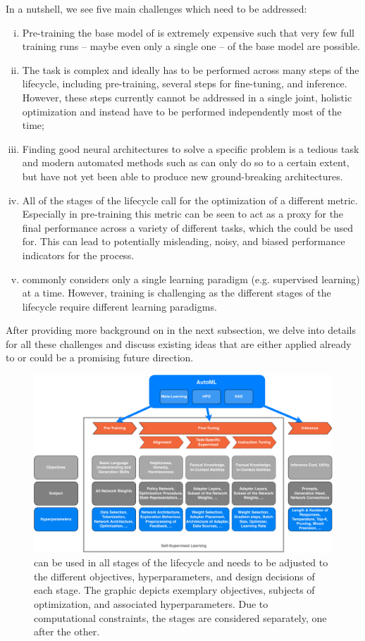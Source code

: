 In a nutshell, we see five main challenges which need to be addressed: 
\begin{enumerate}[(i)] 
    \item Pre-training the base model of \LLMs is extremely expensive such that very few full training runs -- maybe even only a single one -- of the \LLM base model are possible.
    \item The \AutoML task is complex and ideally has to be performed across many steps of the \LLM lifecycle, including pre-training, several steps for fine-tuning, and inference. However, these steps currently cannot be addressed in a single joint, holistic optimization and instead have to be performed independently most of the time;
    \item Finding good neural architectures to solve a specific problem is a tedious task and modern automated methods such as \NAS can only do so to a certain extent, but have not yet been able to produce new ground-breaking architectures.
    \item All of the stages of the \LLM lifecycle call for the optimization of a different metric. Especially in pre-training this metric can be seen to act as a proxy for the final performance across a variety of different tasks, which the \LLM could be used for. This can lead to potentially misleading, noisy, and biased performance indicators for the \AutoML process.
    \item \AutoML commonly considers only a single learning paradigm (e.g. supervised learning) at a time. However, training \LLMs is challenging as the different stages of the lifecycle require different learning paradigms.
\end{enumerate}

After providing more background on \LLMs in the next subsection, we delve into details for all these challenges and discuss existing \AutoML ideas that are either applied already to \LLMs or could be a promising future direction.

\begin{figure}
    \centering
    \includegraphics[width=.75\textwidth]{chapters/human-centric/llm/img/automl_for_llms.pdf}
    \caption{\AutoML can be used in all stages of the \LLM lifecycle and needs to be adjusted to the different objectives, hyperparameters, and design decisions of each stage. The graphic depicts exemplary objectives, subjects of optimization, and associated hyperparameters. Due to computational constraints, the stages are considered separately, one after the other.}
    \label{llm-fig:automl_for_llms}
\end{figure}

